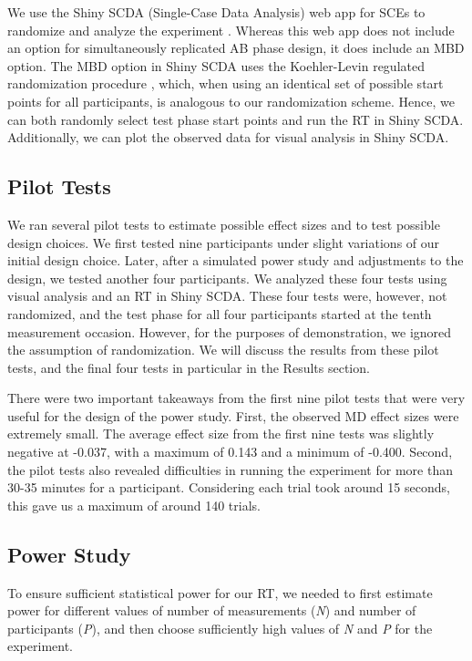 \documentclass{article}
\begin{document}
We use the Shiny SCDA (Single-Case Data Analysis) web app for SCEs to randomize and analyze the experiment \textcite{De2020a}. Whereas this web app does not include an option for simultaneously replicated AB phase design, it does include an MBD option. The MBD option in Shiny SCDA uses the Koehler-Levin regulated randomization procedure \textcite{Levin2018}, which, when using an identical set of possible start points for all participants, is analogous to our randomization scheme. Hence, we can both randomly select test phase start points and run the RT in Shiny SCDA. Additionally, we can plot the observed data for visual analysis in Shiny SCDA. 

\subsection{Pilot Tests}

We ran several pilot tests to estimate possible effect sizes and to test possible design choices. We first tested nine participants under slight variations of our initial design choice. Later, after a simulated power study and adjustments to the design, we tested another four participants. We analyzed these four tests using visual analysis and an RT in Shiny SCDA. These four tests were, however, not randomized, and the test phase for all four participants started at the tenth measurement occasion. However, for the purposes of demonstration, we ignored the assumption of randomization. We will discuss the results from these pilot tests, and the final four tests in particular in the Results section. 

There were two important takeaways from the first nine pilot tests that were very useful for the design of the power study. First, the observed MD effect sizes were extremely small. The average effect size from the first nine tests was slightly negative at -0.037, with a maximum of 0.143 and a minimum of -0.400. Second, the pilot tests also revealed difficulties in running the experiment for more than 30-35 minutes for a participant. Considering each trial took around 15 seconds, this gave us a maximum of around 140 trials.

\subsection{Power Study}

To ensure sufficient statistical power for our RT, we needed to first estimate power for different values of number of measurements (\emph{N}) and number of participants (\emph{P}), and then choose sufficiently high values of \emph{N} and \emph{P} for the experiment. 
\end{document}
